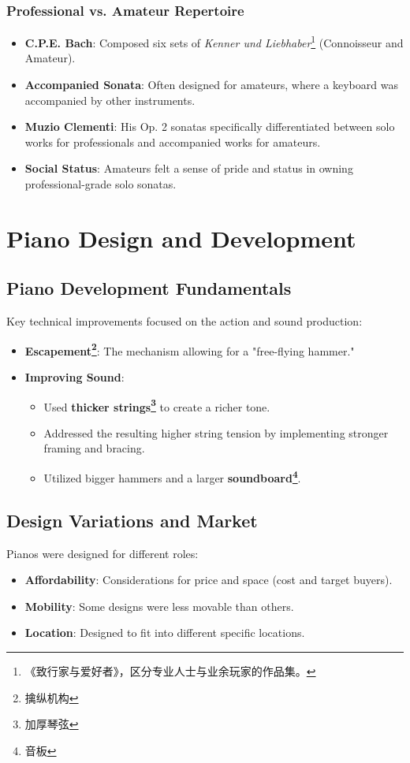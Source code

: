 \documentclass[math,code]{amznotes}
\theoremstyle{remark}
\begin{document}
\subsubsection{Professional vs. Amateur Repertoire}
\begin{itemize}
    \item \textbf{C.P.E. Bach}: Composed six sets of \textit{Kenner und Liebhaber}\footnote{《致行家与爱好者》，区分专业人士与业余玩家的作品集。} (Connoisseur and Amateur).
    \item \textbf{Accompanied Sonata}: Often designed for amateurs, where a keyboard was accompanied by other instruments.
    \item \textbf{Muzio Clementi}: His Op. 2 sonatas specifically differentiated between solo works for professionals and accompanied works for amateurs.
    \item \textbf{Social Status}: Amateurs felt a sense of pride and status in owning professional-grade solo sonatas.
\end{itemize}

\section{Piano Design and Development}

\subsection{Piano Development Fundamentals}
Key technical improvements focused on the action and sound production:
\begin{itemize}
    \item \textbf{Escapement\footnote{擒纵机构}}: The mechanism allowing for a "free-flying hammer."
    \item \textbf{Improving Sound}: 
    \begin{itemize}
        \item Used \textbf{thicker strings\footnote{加厚琴弦}} to create a richer tone.
        \item Addressed the resulting higher string tension by implementing stronger framing and bracing.
        \item Utilized bigger hammers and a larger \textbf{soundboard\footnote{音板}}.
    \end{itemize}
\end{itemize}

\subsection{Design Variations and Market}
Pianos were designed for different roles:
\begin{itemize}
    \item \textbf{Affordability}: Considerations for price and space (cost and target buyers).
    \item \textbf{Mobility}: Some designs were less movable than others.
    \item \textbf{Location}: Designed to fit into different specific locations.
\end{itemize}
\end{document}
